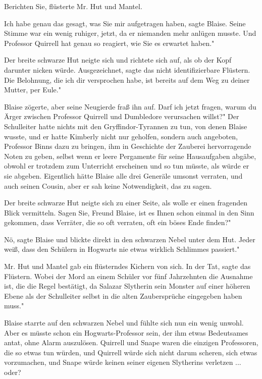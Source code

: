 \glqq{}Berichten Sie\grqq{}, flüsterte Mr. Hut und Mantel.

\glqq{}Ich habe genau das gesagt, was Sie mir aufgetragen haben\grqq{}, sagte
Blaise. Seine Stimme war ein wenig ruhiger, jetzt, da er niemanden mehr anlügen
musste. \glqq{}Und Professor Quirrell hat genau so reagiert, wie Sie es erwartet
haben."

Der breite schwarze Hut neigte sich und richtete sich auf, als ob der Kopf
darunter nicken würde. \glqq{}Ausgezeichnet\grqq{}, sagte das nicht
identifizierbare Flüstern. \glqq{}Die Belohnung, die ich dir versprochen habe,
ist bereits auf dem Weg zu deiner Mutter, per Eule."

Blaise zögerte, aber seine Neugierde fraß ihn auf. \glqq{}Darf ich jetzt fragen,
warum du Ärger zwischen Professor Quirrell und Dumbledore verursachen willst?"
Der Schulleiter hatte nichts mit den Gryffindor-Tyrannen zu tun, von denen
Blaise wusste, und er hatte Kimberly nicht nur geholfen, sondern auch angeboten,
Professor Binns dazu zu bringen, ihm in Geschichte der Zauberei hervorragende
Noten zu geben, selbst wenn er leere Pergamente für seine Hausaufgaben abgäbe,
obwohl er trotzdem zum Unterricht erscheinen und so tun müsste, als würde er sie
abgeben. Eigentlich hätte Blaise alle drei Generäle umsonst verraten, und auch
seinen Cousin, aber er sah keine Notwendigkeit, das zu sagen.

Der breite schwarze Hut neigte sich zu einer Seite, als wolle er einen fragenden
Blick vermitteln. \glqq{}Sagen Sie, Freund Blaise, ist es Ihnen schon einmal in
den Sinn gekommen, dass Verräter, die so oft verraten, oft ein böses Ende
finden?"

\glqq{}Nö\grqq{}, sagte Blaise und blickte direkt in den schwarzen Nebel unter
dem Hut. \glqq{}Jeder weiß, dass den Schülern in Hogwarts nie etwas wirklich
Schlimmes passiert."

Mr. Hut und Mantel gab ein flüsterndes Kichern von sich. \glqq{}In der
Tat\grqq{}, sagte das Flüstern. \glqq{}Wobei der Mord an einem Schüler vor fünf
Jahrzehnten die Ausnahme ist, die die Regel bestätigt, da Salazar Slytherin sein
Monster auf einer höheren Ebene als der Schulleiter selbst in die alten
Zaubersprüche eingegeben haben muss."

Blaise starrte auf den schwarzen Nebel und fühlte sich nun ein wenig unwohl.
Aber es müsste schon ein Hogwarts-Professor sein, der ihm etwas Bedeutsames
antat, ohne Alarm auszulösen. Quirrell und Snape waren die einzigen Professoren,
die so etwas tun würden, und Quirrell würde sich nicht darum scheren, sich etwas
vorzumachen, und Snape würde keinen seiner eigenen Slytherins verletzen ...
oder?

